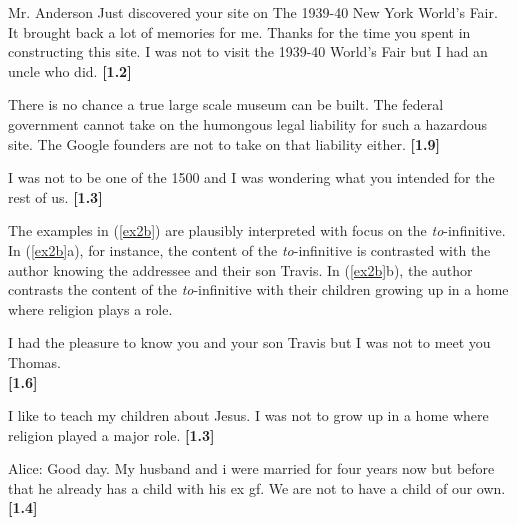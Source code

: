 \documentclass[11pt,fleqn]{article}
\newcommand{\6}{\mbox{$[\hspace*{-.6mm}[$}}
\newcommand{\9}{\mbox{$]\hspace*{-.6mm}]$}}
\begin{document}
\begin{exe} 

\ex\label{subj}

\begin{xlist}

\ex Mr. Anderson Just discovered your site on
The 1939-40 New York World's Fair. It brought back a lot of memories for
me. Thanks for the time you spent in constructing this site. I was not
 to visit the 1939-40 World's Fair but I had an uncle who did. \hfill {\bf [1.2]}


\ex There is no chance a true large scale museum can be built. The federal government cannot take on the humongous legal liability for such a hazardous site. The Google founders are not  to take on that liability either. \hfill {\bf [1.9]}

\ex I was not  to be one of the 1500 and I was wondering what you intended for the rest of us. \hfill {\bf [1.3]}


\end{xlist}

\end{exe}

The examples in (\ref{ex2b}) are plausibly interpreted with focus on the {\em to}-infinitive. In (\ref{ex2b}a), for instance, the content of the {\em to}-infinitive is contrasted with the author knowing the addressee and their son Travis. In (\ref{ex2b}b), the author contrasts the content of the {\em to}-infinitive with their children growing up in a home where religion plays a role.

\begin{exe}
\ex\label{ex2b}
\begin{xlist}

\ex I had the pleasure to know you and your son Travis  but I was not  to meet you  Thomas. \\ \hspace*{.2cm} \hfill {\bf [1.6]}


\ex I like to teach my children about Jesus.  I was not 
to grow up in a home where religion played a major role. \hfill {\bf [1.3]}

\ex Alice: Good day. My husband and i were married for four years now
but before that he already has a child with his ex gf. We are not
 to have a child of our own. \hfill {\bf [1.4]}


\end{xlist}

\end{exe}
\end{document}
